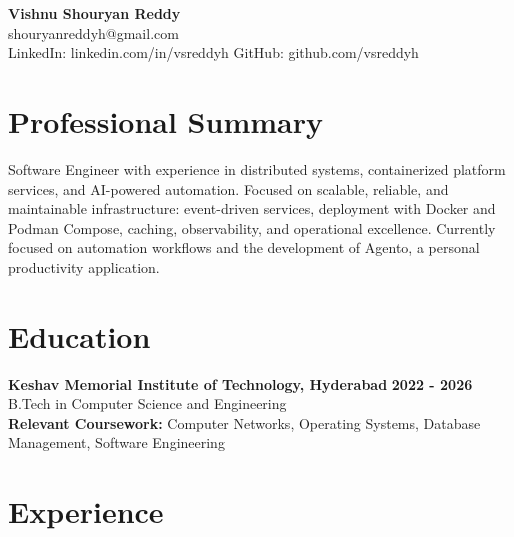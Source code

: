 \documentclass[a4paper,11pt]{article}
\newcommand{\resumeSubheading}[4]{%
  \textbf{#1} \hfill \textbf{#2} \\
{#3} \hfill {#4}
}
\begin{document}
\pagestyle{empty}
\raggedbottom
\addtolength{\textheight}{2\baselineskip}
\small

\begin{center}
  {\LARGE \textbf{Vishnu Shouryan Reddy}}\\[0.3em]
  shouryanreddyh@gmail.com \\[0.3em]
  LinkedIn: linkedin.com/in/vsreddyh \textbar{} GitHub: github.com/vsreddyh
\end{center}
\vspace{-0.8em}

\section*{Professional Summary}

Software Engineer with experience in distributed systems, containerized platform services, and AI-powered automation. Focused on scalable, reliable, and maintainable infrastructure: event-driven services, deployment with Docker and Podman Compose, caching, observability, and operational excellence. Currently focused on automation workflows and the development of Agento, a personal productivity application.

\section*{Education}

\resumeSubheading
{Keshav Memorial Institute of Technology, Hyderabad}{2022 - 2026}
{B.Tech in Computer Science and Engineering}{} \\
\textbf{Relevant Coursework:} Computer Networks, Operating Systems, Database Management, Software Engineering


\section*{Experience}
\end{document}
